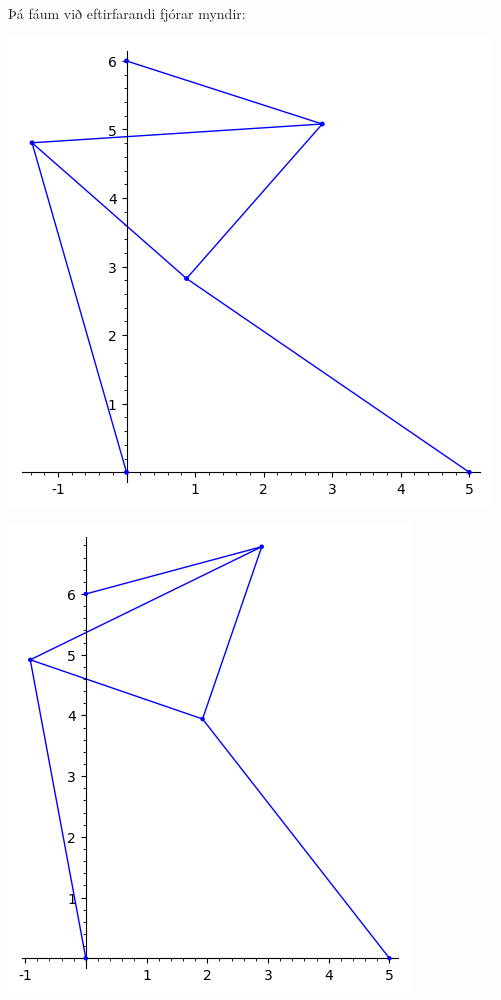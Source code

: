 \documentclass{article}
\begin{document}
\vspace*{0.5cm}

Þá fáum við eftirfarandi fjórar myndir: \\

\begin{multicols}{2}
\begin{center}
\includegraphics[scale=0.4]{lidur4b1plot}
\end{center}
\columnbreak
\begin{center}
\includegraphics[scale=0.4]{lidur4b2plot}
\end{center}
\end{multicols}
\end{document}
